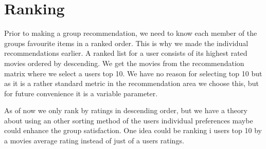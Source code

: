 \section{Ranking}\label{sec:ranking}
Prior to making a group recommendation, we need to know each member of the groups favourite items in a ranked order. This is why we made the individual recommendations earlier. A ranked list for a user consists of its highest rated movies ordered by descending. We get the movies from the recommendation matrix where we select a users top 10. We have no reason for selecting top 10 but as it is a rather standard metric in the recommendation area we choose this, but for future convenience it is a variable parameter. 

As of now we only rank by ratings in descending order, but we have a theory about using an other sorting method of the users individual preferences maybe could enhance the group satisfaction. One idea could be ranking i users top 10 by a movies average rating instead of just of a users ratings. 